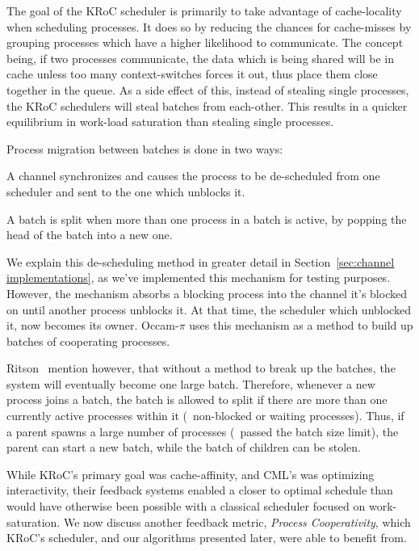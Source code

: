 The goal of the KRoC scheduler is primarily to take advantage of cache-locality
when scheduling processes. It does so by reducing the chances for cache-misses
by grouping processes which have a higher likelihood to communicate. The concept 
being, if two processes communicate, the data which is being shared will be in
cache unless too many context-switches forces it out, thus place them close
together in the queue. As a side effect of this, instead of stealing single 
processes, the KRoC schedulers will steal batches from each-other. This results
in a quicker equilibrium in work-load saturation than stealing single processes.

Process migration between batches is done in two ways: 
\begin{inparaenum}
\item A channel synchronizes and causes the process to be de-scheduled from
one scheduler and sent to the one which unblocks it.
\item A batch is split when more than one process in a batch is active, by 
popping the head of the batch into a new one.
\end{inparaenum}
We explain this de-scheduling method in greater detail in 
Section~\ref{sec:channel implementations}, as we've implemented this mechanism for
testing purposes. However, the mechanism absorbs a blocking process into the 
channel it's blocked on until another process unblocks it. At that time, the
scheduler which unblocked it, now becomes its owner. Occam-$\pi$ uses this 
mechanism as a method to build up batches of cooperating processes.

Ritson \etal~mention however, that without a method to break up the batches, the
system will eventually become one large batch. Therefore, whenever a new process 
joins a batch, the batch is allowed to split if there are more than one currently
active processes within it (\eg~non-blocked or waiting processes). Thus, if a
parent spawns a large number of processes (\ie~passed the batch size limit), the
parent can start a new batch, while the batch of children can be stolen.

While KRoC's primary goal was cache-affinity, and CML's was optimizing 
interactivity, their feedback systems enabled a closer to optimal schedule than
would have otherwise been possible with a classical scheduler focused on 
work-saturation. We now discuss another feedback metric, 
\emph{Process Cooperativity}, 
which KRoC's scheduler, and our algorithms presented later, were able to 
benefit from.

